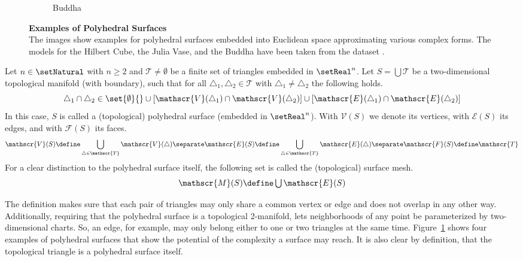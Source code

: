 \documentclass{stdlocal}
\begin{document}
\begin{figure}
\begin{subfigure}[b]{0.23\linewidth}
      \caption{Buddha}
    \end{subfigure}
    \caption[Examples of Polyhedral Surfaces]{%
      \textbf{Examples of Polyhedral Surfaces}\\
      The images show examples for polyhedral surfaces embedded into Euclidean space approximating various complex forms.
      The models for the Hilbert Cube, the Julia Vase, and the Buddha have been taken from the  dataset \autocite{thingi10k}.
    }
    \label{fig:polyhedral-surface-examples}
  \end{figure}

  \begin{definition}
    Let $n\in\setNatural$ with $n\geq 2$ and $\mathscr{T}\neq\emptyset$ be a finite set of triangles embedded in $\setReal^n$.
    Let $S=\bigcup\mathscr{T}$ be a two-dimensional topological manifold (with boundary), such that for all $\triangle_1,\triangle_2\in\mathscr{T}$ with $\triangle_1\neq\triangle_2$ the following holds.
    \[
      \triangle_1\cap\triangle_2 \in \set{\emptyset}{} \cup [\mathscr{V}(\triangle_1)\cap\mathscr{V}(\triangle_2)] \cup [\mathscr{E}(\triangle_1)\cap\mathscr{E}(\triangle_2)]
    \]
    In this case, $S$ is called a (topological) polyhedral surface (embedded in $\setReal^n$).
    With $\mathscr{V}(S)$ we denote its vertices, with $\mathscr{E}(S)$ its edges, and with $\mathscr{F}(S)$ its faces.
    \[
      \mathscr{V}(S) \define \bigcup_{\triangle\in\mathscr{T}} \mathscr{V}(\triangle)
      \separate
      \mathscr{E}(S) \define \bigcup_{\triangle\in\mathscr{T}} \mathscr{E}(\triangle)
      \separate
      \mathscr{F}(S) \define \mathscr{T}
    \]
    For a clear distinction to the polyhedral surface itself, the following set is called the (topological) surface mesh.
    \[
      \mathscr{M}(S) \define \textstyle\bigcup \mathscr{E}(S)
    \]
  \end{definition}

  \noindent
  The definition makes sure that each pair of triangles may only share a common vertex or edge and does not overlap in any other way.
  Additionally, requiring that the polyhedral surface is a topological 2-manifold, lets neighborhoods of any point be parameterized by two-dimensional charts.
  So, an edge, for example, may only belong either to one or two triangles at the same time.
  Figure~\ref{fig:polyhedral-surface-examples} shows four examples of polyhedral surfaces that show the potential of the complexity a surface may reach.
  It is also clear by definition, that the topological triangle is a polyhedral surface itself.
\end{document}
